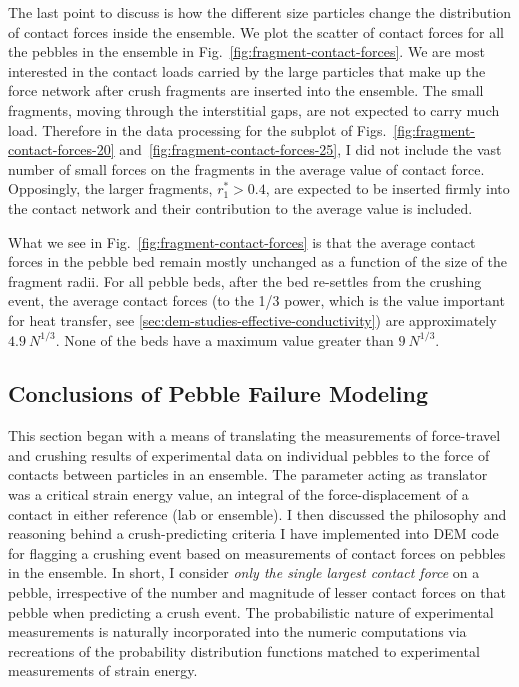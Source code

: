 \FloatBarrier

The last point to discuss is how the different size particles change the distribution of contact forces inside the ensemble. We plot the scatter of contact forces for all the pebbles in the ensemble in Fig.~\ref{fig:fragment-contact-forces}. We are most interested in the contact loads carried by the large particles that make up the force network after crush fragments are inserted into the ensemble. The small fragments, moving through the interstitial gaps, are not expected to carry much load. Therefore in the data processing for the subplot of Figs.~\ref{fig:fragment-contact-forces-20} and~\ref{fig:fragment-contact-forces-25}, I did not include the vast number of small forces on the fragments in the average value of contact force. Opposingly, the larger fragments, $r_1^*>0.4$, are expected to be inserted firmly into the contact network and their contribution to the average value is included.

What we see in Fig.~\ref{fig:fragment-contact-forces} is that the average contact forces in the pebble bed remain mostly unchanged as a function of the size of the fragment radii. For all pebble beds, after the bed re-settles from the crushing event, the average contact forces (to the 1/3 power, which is the value important for heat transfer, see \cref{sec:dem-studies-effective-conductivity}) are approximately $4.9\ N^{1/3}$. None of the beds have a maximum value greater than $9\ N^{1/3}$.

\subsection{Conclusions of Pebble Failure Modeling}

This section began with a means of translating the measurements of force-travel and crushing results of experimental data on individual pebbles to the force of contacts between particles in an ensemble. The parameter acting as translator was a critical strain energy value, an integral of the force-displacement of a contact in either reference (lab or ensemble). I then discussed the philosophy and reasoning behind a crush-predicting criteria I have implemented into DEM code for flagging a crushing event based on measurements of contact forces on pebbles in the ensemble. In short, I consider \textit{only the single largest contact force} on a pebble, irrespective of the number and magnitude of lesser contact forces on that pebble when predicting a crush event. The probabilistic nature of experimental measurements is naturally incorporated into the numeric computations via recreations of the probability distribution functions matched to experimental measurements of strain energy.


